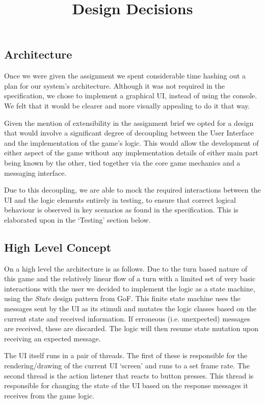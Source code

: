 \documentclass[a4paper, 11pt]{article}
\title{Design Decisions}
\begin{document}
	\maketitle
	\subsection*{Architecture}
	Once we were given the assignment we spent considerable time hashing out a plan for our system's architecture. Although it was not required in the specification, we chose to implement a graphical UI, instead of using the console. We felt that it would be clearer and more visually appealing to do it that way.
	 
	Given the mention of extensibility in the assignment brief we opted for a design that would involve a significant degree of decoupling between the User Interface and the implementation of the game's logic. This would allow the development of either aspect of the game without any implementation details of either main part being known by the other, tied together via the core game mechanics and a messaging interface.
	 
	Due to this decoupling, we are able to mock the required interactions between the UI and the logic elements entirely in testing, to ensure that correct logical behaviour is observed in key scenarios as found in the specification. This is elaborated upon in the `Testing' section below.
	\subsection*{High Level Concept}
	On a high level the architecture is as follows. Due to the turn based nature of this game and the relatively linear flow of a turn with a limited set of very basic interactions with the user we decided to implement the logic as a state machine, using the \textit{State} design pattern from GoF. This finite state machine uses the messages sent by the UI as its stimuli and mutates the logic classes based on the current state and received information. If erroneous (i.e. unexpected) messages are received, these are discarded. The logic will then resume state mutation upon receiving an expected message.
	
The UI itself runs in a pair of threads. The first of these is responsible for the rendering/drawing of the current UI `screen' and runs to a set frame rate. The second thread is the action listener that reacts to button presses. This thread is responsible for changing the state of the UI based on the response messages it receives from the game logic.
\end{document}
